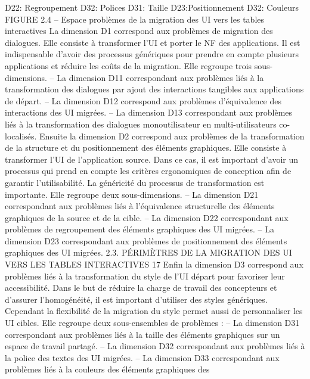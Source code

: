 \documentclass{article}
\begin{document}
D22: Regroupement 
D32: Polices
D31: Taille
D23:Positionnement
D32: Couleurs
FIGURE 2.4 – Espace probl\`{e}mes de la migration des UI vers les tables interactives
La dimension D1 correspond aux probl\`{e}mes de migration des dialogues. Elle consiste \`{a} transformer l’UI et porter le NF des applications. Il est indispensable d’avoir des processus g\'{e}n\'{e}riques
pour prendre en compte plusieurs applications et r\'{e}duire les co\^{u}ts de la migration. Elle regroupe trois
sous-dimensions.
– La dimension D11 correspondant aux probl\`{e}mes li\'{e}s \`{a} la transformation des dialogues par ajout
des interactions tangibles aux applications de d\'{e}part.
– La dimension D12 correspond aux probl\`{e}mes d’\'{e}quivalence des interactions des UI migr\'{e}es.
– La dimension D13 correspondant aux probl\`{e}mes li\'{e}s \`{a} la transformation des dialogues monoutilisateur en multi-utilisateurs co-localis\'{e}s.
Ensuite la dimension D2 correspond aux probl\`{e}mes de la transformation de la structure et du
positionnement des \'{e}l\'{e}ments graphiques. Elle consiste \`{a} transformer l’UI de l’application source.
Dans ce cas, il est important d’avoir un processus qui prend en compte les crit\`{e}res ergonomiques de
conception aﬁn de garantir l’utilisabilit\'{e}. La g\'{e}n\'{e}ricit\'{e} du processus de transformation est importante.
Elle regroupe deux sous-dimensions.
– La dimension D21 correspondant aux probl\`{e}mes li\'{e}s \`{a} l’\'{e}quivalence structurelle des \'{e}l\'{e}ments
graphiques de la source et de la cible.
– La dimension D22 correspondant aux probl\`{e}mes de regroupement des \'{e}l\'{e}ments graphiques
des UI migr\'{e}es.
– La dimension D23 correspondant aux probl\`{e}mes de positionnement des \'{e}l\'{e}ments graphiques
des UI migr\'{e}es.
2.3. PÉRIMÈTRES DE LA MIGRATION DES UI VERS LES TABLES INTERACTIVES
17
Enﬁn la dimension D3 correspond aux probl\`{e}mes li\'{e}s \`{a} la transformation du style de l’UI d\'{e}part
pour favoriser leur accessibilit\'{e}. Dans le but de r\'{e}duire la charge de travail des concepteurs et d’assurer
l’homog\'{e}n\'{e}it\'{e}, il est important d’utiliser des styles g\'{e}n\'{e}riques. Cependant la ﬂexibilit\'{e} de la migration
du style permet aussi de personnaliser les UI cibles. Elle regroupe deux sous-ensembles de probl\`{e}mes :
– La dimension D31 correspondant aux probl\`{e}mes li\'{e}s \`{a} la taille des \'{e}l\'{e}ments graphiques sur un
espace de travail partag\'{e}.
– La dimension D32 correspondant aux probl\`{e}mes li\'{e}s \`{a} la police des textes des UI migr\'{e}es.
– La dimension D33 correspondant aux probl\`{e}mes li\'{e}s \`{a} la couleurs des \'{e}l\'{e}ments graphiques des
\end{document}
